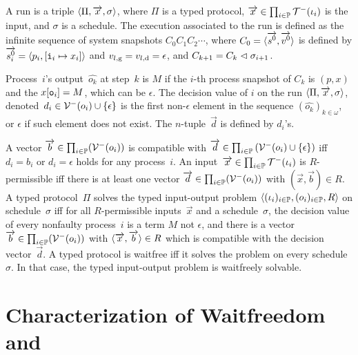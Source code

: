 {A run is a triple $\langle{\Pi, \overrightarrow x, \sigma}\rangle$,
where $\Pi$ is a typed protocol,
$\overrightarrow x \in \prod_{i\in \mathbb{P}} \mathcal{T}^-(\iota_i)$ is the input,
and $\sigma$ is a schedule.
The execution associated to the run
is defined as the infinite sequence of system snapshots
$C_0C_1C_2\cdots$, where $C_0 = \langle{\overrightarrow{s^0}, \overrightarrow{v^0}}\rangle$ is
defined by $\overrightarrow{s^0_i} = \langle{p_i, [\texttt{i}_i\mapsto x_i]}\rangle$ and
${v}_{l, \mathrm g}  = {v}_{l, \mathrm d} = \epsilon$,
and $C_{k+1} = C_{k}\vartriangleleft
\sigma_{i+1}$.

Process~$i$'s output~$\hat{o_k}$ at step~$k$ is
$M$ if the $i$-th process snapshot of $C_k$ is
$(p, x)$ and the $x[\texttt{o}_i] = M$, which can be $\epsilon$.
The decision value of $i$ on the run $\langle{\Pi,\overrightarrow x,\sigma}\rangle$,
denoted~$d_i \in \mathcal{V}^-(o_i)\cup\{\epsilon\}$
 is the first non-$\epsilon$ element in the sequence
 $\left(\hat{o_k}\right)_{k\in\omega}$,
 or
$\epsilon$ if such element does not exist.
The $n$-tuple~$\vec d$ is defined by $d_i$'s.

A vector $\overrightarrow b\in \prod_{i\in \mathbb{P}}(\mathcal{V}^-(o_i))$
is compatible with $\overrightarrow d \in \prod_{i\in
\mathbb{P}}\left(\mathcal{V}^-(o_i)\cup\{\epsilon\}\right)$ iff
$d_i = b_i$ or $d_i = \epsilon$ holds for any process~$i$.
An input~$\overrightarrow x\in \prod_{i\in \mathbb{P}}\mathcal{T}^-(\iota_i)$
is \linebreak[2] $R$-permissible iff there is at least one
vector $\overrightarrow d\in \prod_{i\in \mathbb{P}}(\mathcal{V}^-(o_i))$ with $(\vec x, \vec b)\in R$.
A typed protocol~$\Pi$ solves the typed input-output problem
  $\langle{(\iota_i)_{i\in \mathbb{P}}, (o_i)_{i\in \mathbb{P}}, R}\rangle$ on
schedule~$\sigma$ iff for all $R$-permissible inputs~$\vec x$ and a
schedule~$\sigma$,
 the decision value of every nonfaulty process~$i$ is a term
       $M$ not $\epsilon$, and
 there is a vector $\overrightarrow b\in \prod_{i\in \mathbb{P}}(\mathcal{V}^- (o_i))$
 with $\langle{\overrightarrow x, \overrightarrow b}\rangle \in R$ which is compatible with the
 decision vector~$\vec d$.
 A typed protocol is waitfree iff it solves
 the problem on every schedule~$\sigma$.
 In that case, the typed input-output problem is
 waitfreely solvable.

\section{Characterization of Waitfreedom and \lgd}
\label{comparison}

}
